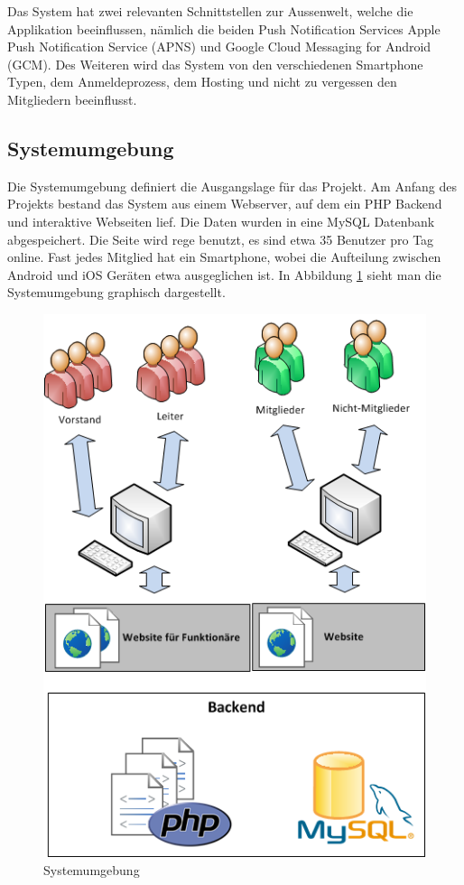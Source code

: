 Das System hat zwei relevanten Schnittstellen zur Aussenwelt, welche die Applikation beeinflussen, nämlich die beiden Push Notification Services Apple Push Notification Service (APNS) und Google Cloud Messaging for Android (GCM). Des Weiteren wird das System von den verschiedenen Smartphone Typen, dem Anmeldeprozess, dem Hosting und nicht zu vergessen den Mitgliedern beeinflusst.

\subsection{Systemumgebung}\label{systemumgebung}
Die Systemumgebung definiert die Ausgangslage für das Projekt. Am Anfang des Projekts bestand das System aus einem Webserver, auf dem ein PHP Backend und interaktive Webseiten lief. Die Daten wurden in eine MySQL Datenbank abgespeichert. Die Seite wird rege benutzt, es sind etwa 35 Benutzer pro Tag online. Fast jedes Mitglied hat ein Smartphone, wobei die Aufteilung zwischen Android und iOS Geräten etwa ausgeglichen ist. In Abbildung \ref{fig:systemumgebung} sieht man die Systemumgebung graphisch dargestellt.
\begin{figure}[h]
\centering
\includegraphics[scale=0.8]{images/visio/systemumgebung.png}
\caption{Systemumgebung}
\label{fig:systemumgebung}
\end{figure}

